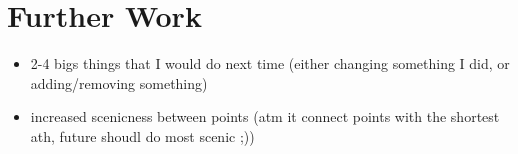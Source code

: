 \section{Further Work}
{\color{red}
	\begin{itemize}
		\item 2-4 bigs things that I would do next time (either changing something I did, or adding/removing something)
		\item increased scenicness between points (atm it connect points with the shortest ath, future shoudl do most scenic ;))
	\end{itemize}
}